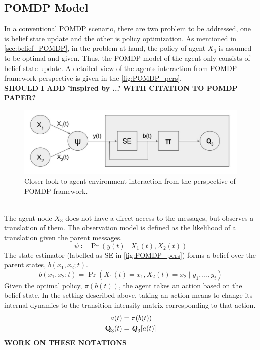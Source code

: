 \subsection{POMDP Model}
In a conventional POMDP scenario, there are two problem to be addressed, one is belief state update and the other is policy optimization. As mentioned in \autoref{sec:belief_POMDP}, in the problem at hand, the policy of agent $ X_3 $ is assumed to be optimal and given. Thus, the POMDP model of the agent only consists of belief state update. A detailed view of the agents interaction from POMDP framework perspective is given in the \autoref{fig:POMDP_pers}. \\
\textbf{SHOULD I ADD 'inspired by ...' WITH CITATION TO POMDP PAPER?}\\
\begin{figure}[htb]
	\begin{center}
		\includegraphics[width=.75\textwidth]{figures/POMDP_pers}
		\caption{Closer look to agent-environment interaction from the perspective of POMDP framework.}
		\label{fig:POMDP_pers}
	\end{center}
\end{figure}\\
The agent node $ X_3 $ does not have a direct access to the messages, but observes a translation of them. The observation model is defined as the likelihood of a translation given the parent messages.
\begin{equation}
\psi \coloneqq \operatorname{Pr}(y(t) \mid X_{1}(t), X_{2}(t))
\end{equation}
The state estimator (labelled as SE in \autoref{fig:POMDP_pers}) forms a belief over the parent states, $  b(x_{1}, x_{2}; t) $. 
\begin{equation}
b(x_{1}, x_{2}; t) = \operatorname{Pr}( X_{1}(t) = x_{1},  X_{2}(t) = x_{2}\mid y_{1}, ..., y_{t})
\end{equation}
Given the optimal policy, $ \pi(b(t)) $, the agent takes an action based on the belief state. In the setting described above, taking an action means to change its internal dynamics to the transition intensity matrix corresponding to that action.
\begin{align}
a(t) &= \pi(b(t))\\
\textbf{Q}_3(t) & = \textbf{\textit{Q}}_3[a(t)]
\end{align}
\textbf{WORK ON THESE NOTATIONS}\\

